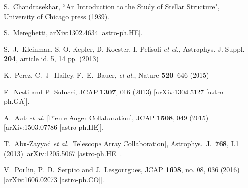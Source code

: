 \documentclass[twocolumn,preprintnumbers,amsmath,amssymb,prd, superscriptaddress]{revtex4} %
\begin{document}
\begin{thebibliography}{99}
S.~Chandrasekhar, ``An Introduction to the Study of Stellar Structure", University of Chicago press (1939).

  S.~Mereghetti,
  arXiv:1302.4634 [astro-ph.HE].


S.~J.~Kleinman, S. O. Kepler, D. Koester, I. Pelisoli  {\it et al.}, Astrophys. J. Suppl. {\bf 204}, article
id. 5, 14 pp. (2013)

K.~Perez, C.~J.~Hailey, F.~E.~Bauer, {\it et al.}, Nature {\bf 520}, 646 (2015)

  F.~Nesti and P.~Salucci,
  JCAP {\bf 1307}, 016 (2013)
  [arXiv:1304.5127 [astro-ph.GA]].


  A.~Aab {\it et al.} [Pierre Auger Collaboration],
  JCAP {\bf 1508}, 049 (2015)
  [arXiv:1503.07786 [astro-ph.HE]].


  T.~Abu-Zayyad {\it et al.} [Telescope Array Collaboration],
  Astrophys.\ J.\  {\bf 768}, L1 (2013)
  [arXiv:1205.5067 [astro-ph.HE]].


  V.~Poulin, P.~D.~Serpico and J.~Lesgourgues,
  JCAP {\bf 1608}, no. 08, 036 (2016)
  [arXiv:1606.02073 [astro-ph.CO]].



\end{thebibliography}
\end{document}
